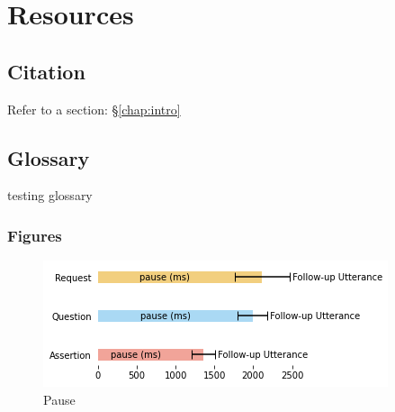
\chapter{Resources}%
\label{chap:resources}


\section{Citation}
\autocite[see also][]{YDVJ2020,daubert2020pedagogical}


\textcite[]{YDVJ2020}


\autocite{YDVJ2020}

\textcite{YDVJ2020}

\citealt{YDVJ2020,daubert2020pedagogical}

Refer to a section: \S\ref{chap:intro}

\section{Glossary}
testing glossary
{\Nom}
{\Sfp}
{\Asp}
\Sfp{}

\subsection{Figures}
\begin{figure}[htbp]
  \centering
  \begin{adjustbox}{width=0.75\textwidth}
    \includegraphics{figures/q-pauses}
  \end{adjustbox}
  \caption{Pause}%
  \label{fig:eng-pauses}
\end{figure}



\section{}%


